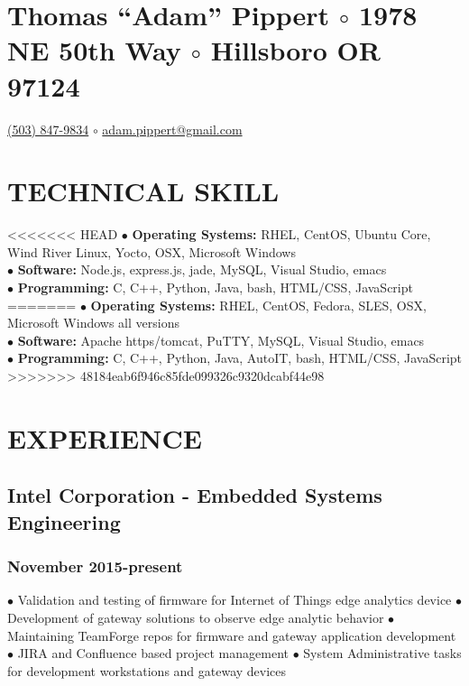 \documentclass{article}
\begin{document}
\section*{Thomas ``Adam'' Pippert $\circ$
1978 NE 50th Way $\circ$
Hillsboro OR 97124}
\href{tel:+15038479834}{(503) 847-9834} $\circ$
\href{mailto:adam.pippert@gmail.com}{adam.pippert@gmail.com}

\section*{TECHNICAL SKILL}

<<<<<<< HEAD
$\bullet$ \textbf{Operating Systems:} RHEL, CentOS, Ubuntu Core, Wind River Linux, Yocto, OSX, Microsoft Windows\\
$\bullet$ \textbf{Software:} Node.js, express.js, jade, MySQL, Visual Studio, emacs\\
$\bullet$ \textbf{Programming:} C, C++, Python, Java, bash, HTML/CSS, JavaScript\\
=======
$\bullet$ \textbf{Operating Systems:} RHEL, CentOS, Fedora, SLES, OSX, Microsoft Windows all versions\\
$\bullet$ \textbf{Software:} Apache https/tomcat, PuTTY, MySQL, Visual Studio, emacs\\
$\bullet$ \textbf{Programming:} C, C++, Python, Java, AutoIT, bash, HTML/CSS, JavaScript\\
>>>>>>> 48184eab6f946c85fde099326c9320dcabf44e98

\section*{EXPERIENCE}

\subsection*{Intel Corporation - Embedded Systems Engineering}
\subsubsection*{November 2015-present}

$\bullet$ Validation and testing of firmware for Internet of Things edge analytics device
$\bullet$ Development of gateway solutions to observe edge analytic behavior
$\bullet$ Maintaining TeamForge repos for firmware and gateway application development
$\bullet$ JIRA and Confluence based project management
$\bullet$ System Administrative tasks for development workstations and gateway devices
\end{document}
